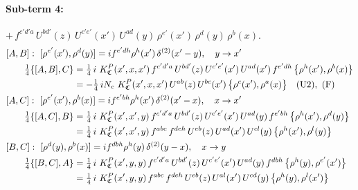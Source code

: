 \documentclass[10pt]{article}
\numberwithin{equation}{section}
\begin{document}
\paragraph{Sub-term 4:} $+\,f^{c'd'a}\,U^{bd'}(z)\,U^{c'e'}(x')\,U^{ad}(y)\,\rho^{e'}(x')\,\rho^{d}(y)\,\rho^{b}(x)$.
\begin{align}
&[A,B]:\ [\rho^{e'}(x'),\rho^{d}(y)]=i f^{e'dh}\rho^{h}(x')\,\delta^{(2)}(x'-y),\quad y\to x'\notag\\
&\qquad \tfrac14\{[A,B],C\}=\tfrac14\,i\,\,K^{P}_{\mathfrak C}(x',x,x')\,f^{c'd'a}\,U^{bd'}(z)\,U^{c'e'}(x')\,U^{ad}(x')\,f^{e'dh}\,\big\{\rho^{h}(x'),\rho^{b}(x)\big\}\notag\\
&\qquad\phantom{\tfrac14\{[A,B],C\}}=-\tfrac14\,i N_{c}\,\,K^{P}_{\mathfrak C}(x',x,x')\,U^{ab}(z)\,U^{bc}(x')\,\big\{\rho^{c}(x'),\rho^{a}(x)\big\}\quad\text{(U2)},\ \text{(F)}
\label{B:eq:GIII.VI.P-4-AB}\\
&[A,C]:\ [\rho^{e'}(x'),\rho^{b}(x)]=i f^{e'bh}\rho^{h}(x')\,\delta^{(2)}(x'-x),\quad x\to x'\notag\\
&\qquad \tfrac14\{[A,C],B\}=\tfrac14\,i\,\,K^{P}_{\mathfrak C}(x',x',y)\,f^{c'd'a}\,U^{bd'}(z)\,U^{c'e'}(x')\,U^{ad}(y)\,f^{e'bh}\,\big\{\rho^{h}(x'),\rho^{d}(y)\big\}\notag\\
&\qquad\phantom{\tfrac14\{[A,C],B\}}=\tfrac14\,i\,\,K^{P}_{\mathfrak C}(x',x',y)\,f^{abc}\,f^{deh}\,U^{eb}(z)\,U^{ad}(x')\,U^{cl}(y)\,\big\{\rho^{h}(x'),\rho^{l}(y)\big\}
\label{B:eq:GIII.VI.P-4-AC}\\
&[B,C]:\ [\rho^{d}(y),\rho^{b}(x)]=i f^{dbh}\rho^{h}(y)\,\delta^{(2)}(y-x),\quad x\to y\notag\\
&\qquad \tfrac14\{[B,C],A\}=\tfrac14\,i\,\,K^{P}_{\mathfrak C}(x',y,y)\,f^{c'd'a}\,U^{bd'}(z)\,U^{c'e'}(x')\,U^{ad}(y)\,f^{dbh}\,\big\{\rho^{h}(y),\rho^{e'}(x')\big\}\notag\\
&\qquad\phantom{\tfrac14\{[B,C],A\}}=\tfrac14\,i\,\,K^{P}_{\mathfrak C}(x',y,y)\,f^{abc}\,f^{deh}\,U^{eb}(z)\,U^{al}(x')\,U^{cd}(y)\,\big\{\rho^{h}(y),\rho^{l}(x')\big\}
\label{B:eq:GIII.VI.P-4-BC}
\end{align}
\end{document}
